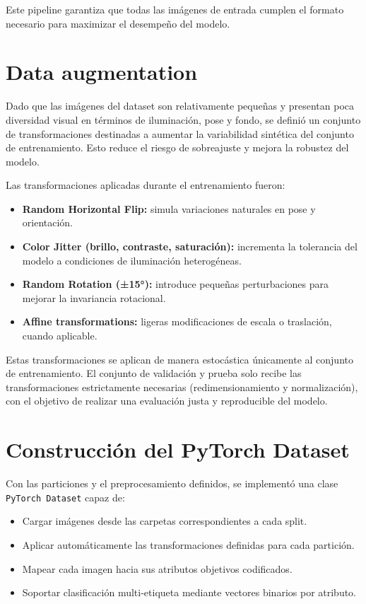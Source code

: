 Este pipeline garantiza que todas las imágenes de entrada cumplen el formato necesario para maximizar el desempeño del modelo.

\section{Data augmentation}

Dado que las imágenes del dataset son relativamente pequeñas y presentan poca diversidad visual en términos de iluminación, pose y fondo, se definió un conjunto de transformaciones destinadas a aumentar la variabilidad sintética del conjunto de entrenamiento. Esto reduce el riesgo de sobreajuste y mejora la robustez del modelo.

Las transformaciones aplicadas durante el entrenamiento fueron:

\begin{itemize}
    \item \textbf{Random Horizontal Flip:} simula variaciones naturales en pose y orientación.
    \item \textbf{Color Jitter (brillo, contraste, saturación):} incrementa la tolerancia del modelo a condiciones de iluminación heterogéneas.
    \item \textbf{Random Rotation (±15°):} introduce pequeñas perturbaciones para mejorar la invariancia rotacional.
    \item \textbf{Affine transformations:} ligeras modificaciones de escala o traslación, cuando aplicable.
\end{itemize}

Estas transformaciones se aplican de manera estocástica únicamente al conjunto de entrenamiento. El conjunto de validación y prueba solo recibe las transformaciones estrictamente necesarias (redimensionamiento y normalización), con el objetivo de realizar una evaluación justa y reproducible del modelo.

\section{Construcción del PyTorch Dataset}

Con las particiones y el preprocesamiento definidos, se implementó una clase \texttt{PyTorch Dataset} capaz de:

\begin{itemize}
    \item Cargar imágenes desde las carpetas correspondientes a cada split.
    \item Aplicar automáticamente las transformaciones definidas para cada partición.
    \item Mapear cada imagen hacia sus atributos objetivos codificados.
    \item Soportar clasificación multi-etiqueta mediante vectores binarios por atributo.
\end{itemize}

